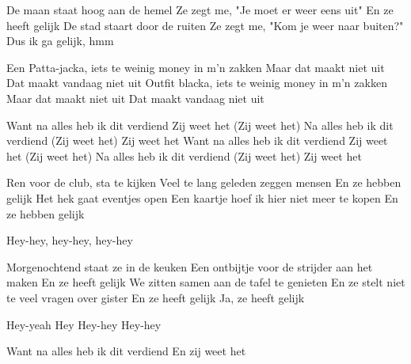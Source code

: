 
\begin{verse*}
De maan staat hoog aan de hemel
Ze zegt me, "Je moet er weer eens uit"
En ze heeft gelijk
De stad staart door de ruiten
Ze zegt me, "Kom je weer naar buiten?"
Dus ik ga gelijk, hmm
\end{verse*}

\begin{prechorus}
Een Patta-jacka, iets te weinig money in m'n zakken
Maar dat maakt niet uit
Dat maakt vandaag niet uit
Outfit blacka, iets te weinig money in m'n zakken
Maar dat maakt niet uit
Dat maakt vandaag niet uit
\end{prechorus}

\begin{chorus}
Want na alles heb ik dit verdiend
Zij weet het (Zij weet het)
Na alles heb ik dit verdiend (Zij weet het)
Zij weet het
Want na alles heb ik dit verdiend
Zij weet het (Zij weet het)
Na alles heb ik dit verdiend (Zij weet het)
Zij weet het
\end{chorus}
\begin{verse*}
Ren voor de club, sta te kijken
Veel te lang geleden zeggen mensen
En ze hebben gelijk
Het hek gaat eventjes open
Een kaartje hoef ik hier niet meer te kopen
En ze hebben gelijk
\end{verse*}

\theprechorus
\thechorus

\begin{verse*}
Hey-hey, hey-hey, hey-hey

Morgenochtend staat ze in de keuken
Een ontbijtje voor de strijder aan het maken
En ze heeft gelijk
We zitten samen aan de tafel te genieten
En ze stelt niet te veel vragen over gister
En ze heeft gelijk
Ja, ze heeft gelijk
\end{verse*}

\thechorus

\begin{verse*}
Hey-yeah
Hey
Hey-hey
Hey-hey

Want na alles heb ik dit verdiend
En zij weet het
\end{verse*}